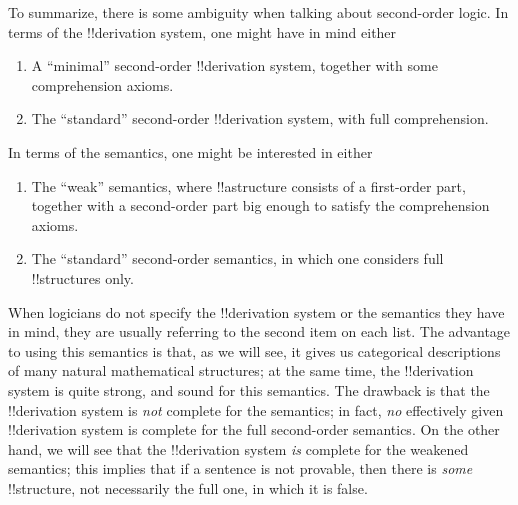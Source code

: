\documentclass[../../../include/open-logic-section]{subfiles}
\begin{document}
To summarize, there is some ambiguity when talking about second-order
logic. In terms of the !!{derivation} system, one might have in mind either
\begin{enumerate}
\item A ``minimal'' second-order !!{derivation} system, together with some
  comprehension axioms.
\item The ``standard'' second-order !!{derivation} system, with full
  comprehension.
\end{enumerate}
In terms of the semantics, one might be interested in either
\begin{enumerate}
\item The ``weak'' semantics, where !!a{structure} consists of a first-order
  part, together with a second-order part big enough to satisfy the
  comprehension axioms.
\item The ``standard'' second-order semantics, in which one considers
  full !!{structure}s only.
\end{enumerate}
When logicians do not specify the !!{derivation} system or the semantics they
have in mind, they are usually referring to the second item on each
list. The advantage to using this semantics is that, as we will see,
it gives us categorical descriptions of many natural mathematical
structures; at the same time, the !!{derivation} system is quite strong, and
sound for this semantics. The drawback is that the !!{derivation} system is
\emph{not} complete for the semantics; in fact, \emph{no} effectively
given !!{derivation} system is complete for the full second-order semantics. On
the other hand, we will see that the !!{derivation} system \emph{is} complete
for the weakened semantics; this implies that if a sentence is not
provable, then there is \emph{some} !!{structure}, not necessarily the
full one, in which it is false.
\end{document}
